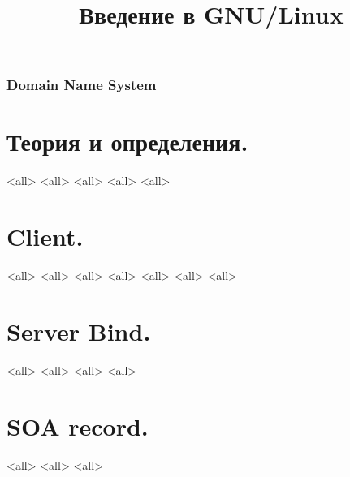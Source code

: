 

\title{Введение в GNU/Linux}




\begin{frame}
	\frametitle{Domain Name System}
	\titlepage
	\vspace{-0.5cm}
	\begin{center}
	\end{center}
\end{frame}


\begin{frame}
	\tableofcontents
	[hideallsubsections]
\end{frame}


\section{Теория и определения.}
\mode<all>{}
\mode<all>{}
\mode<all>{}
\mode<all>{}
\mode<all>{}
\section{Client.}
\mode<all>{}
\mode<all>{}
\mode<all>{}
\mode<all>{}
\mode<all>{}
\mode<all>{}
\mode<all>{}
\section{Server Bind.}
\mode<all>{}
\mode<all>{}
\mode<all>{}
\mode<all>{}
\section{SOA record.}
\mode<all>{}
\mode<all>{}
\mode<all>{}

